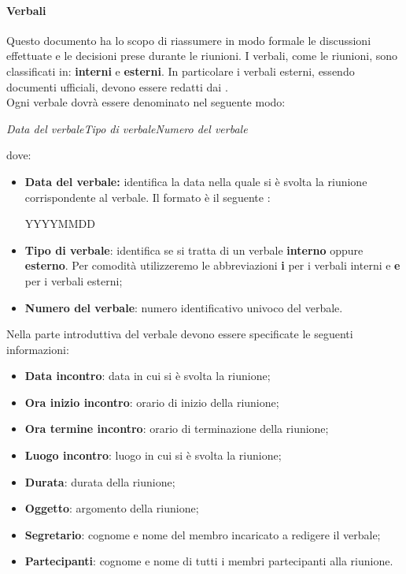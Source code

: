 \paragraph{Verbali}
Questo documento ha lo scopo di riassumere in modo formale le discussioni effettuate e le decisioni 
prese durante le riunioni. I verbali, come le riunioni, sono classificati in: 
\textbf{interni} e \textbf{esterni}. In particolare i verbali esterni, essendo 
documenti ufficiali, devono essere redatti dai \textit{\RdP}. \\
Ogni verbale dovrà essere denominato nel seguente modo:
\begin{center}
  \textit{{Data del verbale}{Tipo di verbale}{Numero del verbale}}
\end{center}
dove:
\begin{itemize}
  \item \textbf{Data del verbale:} identifica la data nella quale si è svolta la 
  riunione corrispondente al verbale. Il formato è il seguente : 
  \begin{center}
  YYYYMMDD
  \end{center}
  \item \textbf{Tipo di verbale}: identifica se si tratta di un verbale \textbf{interno} oppure \textbf{esterno}.
  Per comodità utilizzeremo le abbreviazioni \textbf{i} per i verbali interni e \textbf{e} per i verbali 
  esterni;
  \item \textbf{Numero del verbale}: numero identificativo univoco del verbale.  
\end{itemize}
Nella parte introduttiva del verbale devono essere specificate le seguenti informazioni:
\begin{itemize}
  \item \textbf{Data incontro}: data in cui si è svolta la riunione;
  \item \textbf{Ora inizio incontro}: orario di inizio della riunione;
  \item \textbf{Ora termine incontro}: orario di terminazione della riunione;
  \item \textbf{Luogo incontro}: luogo in cui si è svolta la riunione;
  \item \textbf{Durata}: durata della riunione;
  \item \textbf{Oggetto}: argomento della riunione;
  \item \textbf{Segretario}: cognome e nome del membro incaricato a redigere il 
  verbale;
  \item \textbf{Partecipanti}: cognome e nome di tutti i membri partecipanti 
  alla riunione.
\end{itemize}

